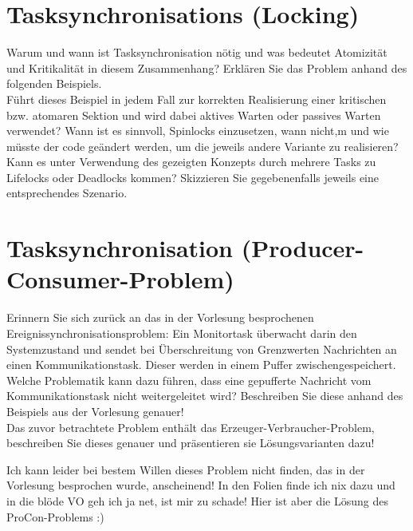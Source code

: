 \documentclass[12pt,a4paper,ngerman]{article}
\begin{document}


%
%

\section*{Tasksynchronisations (Locking)}


\begin{framed}
Warum und wann ist Tasksynchronisation nötig und was bedeutet Atomizität und Kritikalität in diesem Zusammenhang?
Erklären Sie das Problem anhand des folgenden Beispiels. \\
Führt dieses Beispiel in jedem Fall zur korrekten Realisierung einer kritischen bzw. atomaren Sektion und wird dabei aktives Warten oder passives Warten verwendet?
Wann ist es sinnvoll, Spinlocks einzusetzen, wann nicht,m und wie müsste der code geändert werden, um die jeweils andere Variante zu realisieren? \\
Kann es unter Verwendung des gezeigten Konzepts durch mehrere Tasks zu Lifelocks oder Deadlocks kommen? Skizzieren Sie gegebenenfalls jeweils eine entsprechendes Szenario.
\end{framed}



\pagebreak
\section*{Tasksynchronisation (Producer-Consumer-Problem)}


\begin{framed}
Erinnern Sie sich zurück an das in der Vorlesung besprochenen Ereignissynchronisationsproblem: Ein Monitortask überwacht darin den Systemzustand und sendet bei Überschreitung von Grenzwerten Nachrichten an einen Kommunikationstask. Dieser werden in einem Puffer zwischengespeichert. \\
Welche Problematik kann dazu führen, dass eine gepufferte Nachricht vom Kommunikationstask nicht weitergeleitet wird? Beschreiben Sie diese anhand des Beispiels aus der Vorlesung genauer!\\
Das zuvor betrachtete Problem enthält das Erzeuger-Verbraucher-Problem, beschreiben Sie dieses genauer und präsentieren sie Lösungsvarianten dazu!
\end{framed}

Ich kann leider bei bestem Willen dieses Problem nicht finden, das in der Vorlesung besprochen wurde, anscheinend! In den Folien finde ich nix dazu und in die blöde VO geh ich ja net, ist mir zu schade! Hier ist aber die Lösung des ProCon-Problems :)
\pagebreak
{}
\pagebreak
\end{document}
